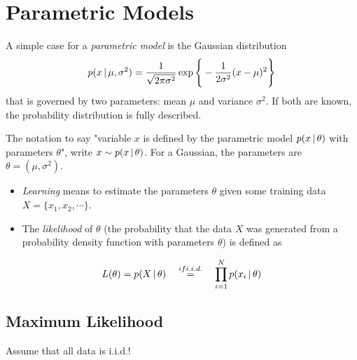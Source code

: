 	\section{Parametric Models}
		A simple case for a \emph{parametric model} is the Gaussian distribution
		\begin{equation}
			p(x \,\vert\, \mu, \sigma^2) = \frac{1}{\sqrt{2\pi\sigma^2}} \exp\Bigg\{ -\frac{1}{2\sigma^2} (x - \mu)^2 \Bigg\}
		\end{equation}
		that is governed by two parameters: mean \(\mu\) and variance \(\sigma^2\). If both are known, the probability distribution is fully described.

		The notation to say "variable \(x\) is defined by the parametric model \( p(x \,\vert\, \theta) \) with parameters \(\theta\)", write \( x \sim p(x \,\vert\, \theta) \). For a Gaussian, the parameters are \( \theta = (\mu, \sigma^2) \).

		\begin{itemize}
			\item \emph{Learning} means to estimate the parameters \(\theta\) given some training data \( X = \{ x_1, x_2, \cdots \} \).
			\item The \emph{likelihood} of \(\theta\) (the probability that the data \(X\) was generated from a probability density function with parameters \(\theta\)) is defined as
		\end{itemize}
		\begin{equation}
			L(\theta) = p(X \,\vert\, \theta) \quad\overset{if i.i.d.}{=}\quad \prod_{i = 1}^{N} p(x_i \,\vert\, \theta)
		\end{equation}

		\subsection{Maximum Likelihood}
			Assume that all data is i.i.d.!

